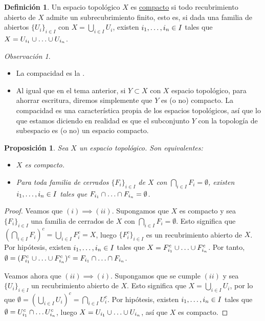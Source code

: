 \documentclass[12pt]{report}
\newtheorem{proposition}{Proposición}[chapter]
\theoremstyle{definition}
\newtheorem{definition}{Definición}[chapter]
\theoremstyle{definition}
\theoremstyle{remark}
\newtheorem*{obs}{Observación} %
\begin{document}
\begin{definition}
Un espacio topológico $X$ es \underline{compacto} si todo recubrimiento abierto de $X$ admite un subrecubrimiento finito, esto es, si dada una familia de abiertos $\{U_i\}_{i \in I}$ con $X = \bigcup_{i \in I}U_i$, existen $i_1,\mathellipsis,i_n \in I$ tales que $X = U_{i_1} \cup \mathellipsis \cup U_{i_n}$. 
\end{definition}

\begin{obs}
\hfill
\begin{itemize}
    \item La compacidad es la .
    \item Al igual que en el tema anterior, si $Y \subset X$ con $X$ espacio topológico, para ahorrar escritura, diremos simplemente que $Y$ es (o no) compacto. La compacidad es una característica propia de los espacios topológicos, así que lo que estamos diciendo en realidad es que el subconjunto $Y$ con la topología de subespacio es (o no) un espacio compacto.
\end{itemize}
\end{obs}


\begin{proposition}
Sea $X$ un espacio topológico. Son equivalentes:
\begin{itemize}
    \item[(i)] $X$ es compacto.
    \item[(ii)] Para toda familia de cerrados $\{F_i\}_{i \in I}$ de $X$ con $\bigcap_{i \in I}F_i = \emptyset$, existen $i_1,\mathellipsis,i_n \in I$ tales que $F_{i_1} \cap \mathellipsis \cap F_{i_n} = \emptyset$.
\end{itemize}
\end{proposition}

\begin{proof}
Veamos que $(i) \implies (ii)$. Supongamos que $X$ es compacto y sea $\{F_i\}_{i \in I}$ una familia de cerrados de $X$ con $\bigcap_{i \in I}F_i = \emptyset$. Esto significa que $(\bigcap_{i \in I}F_i)^c = \bigcup_{i \in I}F_i^c = X$, luego $\{F_i^c\}_{i \in I}$ es un recubrimiento abierto de $X$. Por hipótesis, existen $i_1,\mathellipsis,i_n \in I$ tales que $X = F_{i_1}^c \cup \mathellipsis \cup F_{i_n}^c$. Por tanto, $\emptyset = (F_{i_1}^c \cup \mathellipsis \cup F_{i_n}^c)^c = F_{i_1} \cap \mathellipsis \cap F_{i_n}$.

\vspace{2mm}
Veamos ahora que $(ii) \implies (i)$. Supongamos que se cumple $(ii)$ y sea $\{U_i\}_{i \in I}$ un recubrimiento abierto de $X$. Esto significa que $X = \bigcup_{i \in I}U_i$, por lo que $\emptyset = (\bigcup_{i \in I}U_i)^c = \bigcap_{i \in I}U_i^c$. Por hipótesis, existen $i_1,\mathellipsis,i_n \in I$ tales que $\emptyset = U_{i_1}^c \cap \mathellipsis U_{i_n}^c$, luego $X = U_{i_1} \cup \mathellipsis \cup U_{i_n}$, así que $X$ es compacto.
\end{proof}
\end{document}
